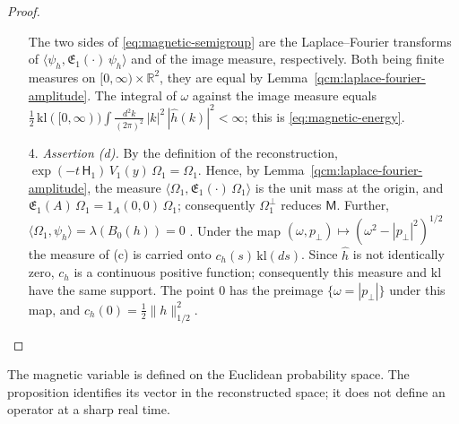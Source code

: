 \documentclass[11pt,letterpaper,reqno]{amsart}
\theoremstyle{definition}
\begin{document}
\begin{proof}
\begin{enumerate}
The two sides of \eqref{eq:magnetic-semigroup} are the Laplace--Fourier transforms of $\langle\psi_h,\mathfrak E_1(\cdot)\,\psi_h\rangle$ \cite[Proposition~7.2]{QEDConstruction} and of the image measure, respectively.
Both being finite measures on $[0,\infty)\times\mathbb R^2$, they are equal by Lemma~\ref{qcm:laplace-fourier-amplitude}.
The integral of $\omega$ against the image measure equals $\frac12\,\allowbreak \mathrm{kl}([0,\allowbreak \infty))\int\frac{d^2k}{(2\pi)^2}\,\allowbreak |k|^2\,\allowbreak |\hat h(k)|^2<\infty$; this is \eqref{eq:magnetic-energy}.
\item[4.] \emph{Assertion (d).}
By the definition of the reconstruction, $\exp(-t\,\mathsf H_1)\,V_1(y)\,\Omega_1=\Omega_1$.
Hence, by Lemma~\ref{qcm:laplace-fourier-amplitude}, the measure $\langle\Omega_1,\mathfrak E_1(\cdot)\,\Omega_1\rangle$ is the unit mass at the origin, and $\mathfrak E_1(A)\,\Omega_1=1_A(0,0)\,\Omega_1$; consequently $\Omega_1^\perp$ reduces $\mathsf M$.
Further, $\langle\Omega_1,\psi_h\rangle=\lambda(B_0(h))=0$ \cite[Proposition~5.1]{QEDConstruction}.
Under the map $(\omega,p_\perp)\mapsto(\omega^2-|p_\perp|^2)^{1/2}$ the measure of (c) is carried onto $c_h(s)\,\mathrm{kl}(ds)$.
Since $\hat h$ is not identically zero, $c_h$ is a continuous positive function; consequently this measure and $\mathrm{kl}$ have the same support.
The point $0$ has the preimage $\{\omega=|p_\perp|\}$ under this map, and $c_h(0)=\frac12\|h\|_{1/2}^2$.
\end{enumerate}
\end{proof}

The magnetic variable is defined on the Euclidean probability space.
The proposition identifies its vector in the reconstructed space; it
does not define an operator at a sharp real time.
\end{document}
